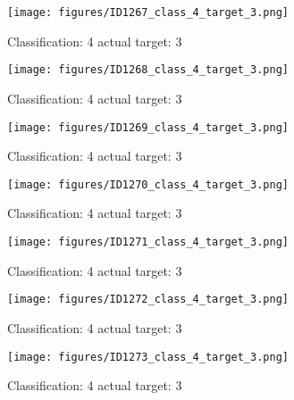 \begin{figure}[h!]
\begin{center}
\texttt{[image: figures/ID1267\_class\_4\_target\_3.png]}
\end{center}
\caption{ Classification: 4 actual target: 3}
\label{fig:ID1267_class_4_target_3}
\end{figure}
\begin{figure}[h!]
\begin{center}
\texttt{[image: figures/ID1268\_class\_4\_target\_3.png]}
\end{center}
\caption{ Classification: 4 actual target: 3}
\label{fig:ID1268_class_4_target_3}
\end{figure}
\begin{figure}[h!]
\begin{center}
\texttt{[image: figures/ID1269\_class\_4\_target\_3.png]}
\end{center}
\caption{ Classification: 4 actual target: 3}
\label{fig:ID1269_class_4_target_3}
\end{figure}
\begin{figure}[h!]
\begin{center}
\texttt{[image: figures/ID1270\_class\_4\_target\_3.png]}
\end{center}
\caption{ Classification: 4 actual target: 3}
\label{fig:ID1270_class_4_target_3}
\end{figure}
\begin{figure}[h!]
\begin{center}
\texttt{[image: figures/ID1271\_class\_4\_target\_3.png]}
\end{center}
\caption{ Classification: 4 actual target: 3}
\label{fig:ID1271_class_4_target_3}
\end{figure}
\begin{figure}[h!]
\begin{center}
\texttt{[image: figures/ID1272\_class\_4\_target\_3.png]}
\end{center}
\caption{ Classification: 4 actual target: 3}
\label{fig:ID1272_class_4_target_3}
\end{figure}
\begin{figure}[h!]
\begin{center}
\texttt{[image: figures/ID1273\_class\_4\_target\_3.png]}
\end{center}
\caption{ Classification: 4 actual target: 3}
\label{fig:ID1273_class_4_target_3}
\end{figure}
